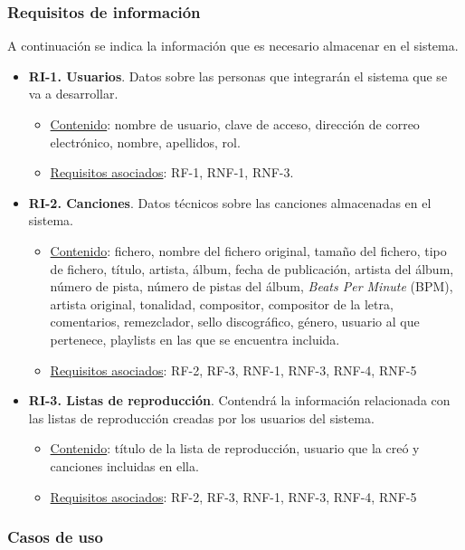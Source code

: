 \subsubsection{Requisitos de información}
A continuación se indica la información que es necesario almacenar en el sistema.

\begin{itemize}
	\item \textbf{RI-1. Usuarios}. Datos sobre las personas que integrarán el sistema que se va a desarrollar.
	\begin{itemize}
		\item \underline{Contenido}: nombre de usuario, clave de acceso, dirección de correo electrónico, nombre, apellidos, rol.
		\item \underline{Requisitos asociados}: RF-1, RNF-1, RNF-3.
	\end{itemize}
	
	\item \textbf{RI-2. Canciones}. Datos técnicos sobre las canciones almacenadas en el sistema.
	\begin{itemize}
		\item \underline{Contenido}: fichero, nombre del fichero original, tamaño del fichero, tipo de fichero, título, artista, álbum, fecha de publicación, artista del álbum, número de pista, número de pistas del álbum, \textit{Beats Per Minute} (BPM), artista original, tonalidad, compositor, compositor de la letra, comentarios, remezclador, sello discográfico, género, usuario al que pertenece, playlists en las que se encuentra incluida.
		\item \underline{Requisitos asociados}: RF-2, RF-3, RNF-1, RNF-3, RNF-4, RNF-5
	\end{itemize}
	
	\item \textbf{RI-3. Listas de reproducción}. Contendrá la información relacionada con las listas de reproducción creadas por los usuarios del sistema.
	\begin{itemize}
		\item \underline{Contenido}: título de la lista de reproducción, usuario que la creó y canciones incluidas en ella.
		\item \underline{Requisitos asociados}: RF-2, RF-3, RNF-1, RNF-3, RNF-4, RNF-5
	\end{itemize}
	
\end{itemize}

\subsubsection{Casos de uso}

